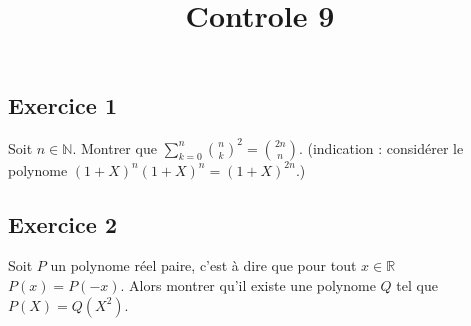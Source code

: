 \documentclass{article}
\begin{document}
\title{Controle 9}
\maketitle
\renewcommand{\labelitemi}{$\circ$}
\subsection*{Exercice 1}
Soit $n\in \mathbb{N}$. Montrer que $\sum_{k=0}^n \binom{n}{k}^2 =
\binom{2n}{n}$. (indication : consid{\'e}rer le polynome $(1+X)^n(1+X)^n=(1+X)^{2n}$.)

\subsection*{Exercice 2}
Soit $P$ un polynome r{\'e}el paire, c'est {\`a} dire que pour tout $x\in
\mathbb{R}$ \ $P(x) = P(-x)$. Alors montrer qu'il existe une polynome
$Q$ tel que $P(X)= Q(X^2)$.








\end{document}
